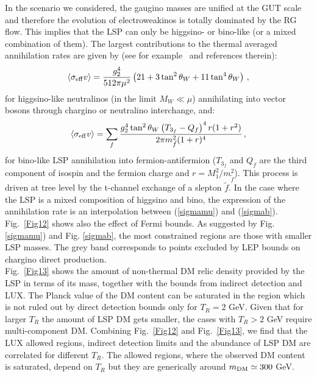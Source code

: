 \documentclass[12pt,a4paper]{book}
\begin{document}
In the scenario we considered, the gaugino masses are unified at the GUT scale and therefore the evolution of electroweakinos is totally dominated by the RG flow. This implies that the LSP can only be higgsino- or bino-like (or a mixed combination of them). The largest contributions to the thermal averaged annihilation rates are given by (see for example~\cite{ArkaniHamed:2006mb} and references therein):
\begin{align}
\langle \sigma_{\rm eff} v \rangle = \frac{g_2^4}{512 \pi \mu^2}\left(21 + 3 \tan^2\theta_W +  11 \tan^4\theta_W \right)\,,
\label{sigmamu}
\end{align}
for higgsino-like neutralinos (in the limit $M_W \ll \mu$) annihilating into vector bosons through chargino or neutralino interchange, and:
\begin{align}
\langle  \sigma_{\rm eff} v \rangle =  \sum_f \frac{g_2^4 \tan^2 \theta_W \left( T_{3_f} - Q_f \right)^4 r (1+r^2)}{2\pi m_{\tilde f}^2(1+r)^4}\,,
\label{sigmab}
\end{align}
for bino-like LSP annihilation into fermion-antifermion ($T_{3_f}$ and $Q_f$ are the third component of isospin and the fermion charge and $r = M_1^2 / m_{\tilde f}^2$). This process is driven at tree level by the t-channel exchange of a slepton ${\tilde f}$. In the case where the LSP is a mixed composition of higgsino and bino, the expression of the annihilation rate is an interpolation between (\ref{sigmamu}) and (\ref{sigmab}).
Fig.~\ref{Fig12} shows also the effect of Fermi bounds. As suggested by Fig. \eqref{sigmamu}) and Fig. \eqref{sigmab}, the most constrained regions are those with smaller LSP masses. The grey band corresponds to points excluded by LEP bounds on chargino direct production.\\

Fig.~\ref{Fig13} shows the amount of non-thermal DM relic density provided by the LSP in terms of its mass, together with the bounds from indirect detection and LUX. The Planck value of the DM content can be saturated in the region which is not ruled out by direct detection bounds only for $T_R = 2$ GeV. Given that for larger $T_R$ the amount of LSP DM gets smaller, the cases with $T_R > 2$ GeV require multi-component DM. Combining Fig.~\ref{Fig12} and Fig.~\ref{Fig13}, we find  that the LUX allowed regions, indirect detection limits and the abundance of LSP DM are correlated for different $T_R$. The allowed regions, where the observed DM content is saturated, depend on $T_R$ but they are generically around $m_{\rm DM} \simeq 300$ GeV.\\
\end{document}
